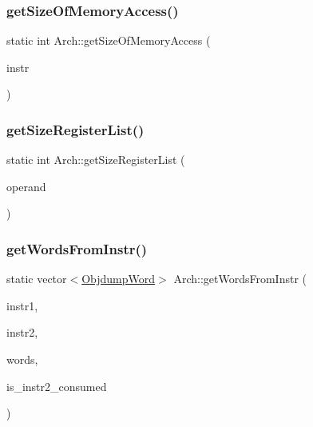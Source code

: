 \mbox{\label{classArch_ad07f05d2dfa30d60ae8a32642b029d10}} 
\subsubsection{\texorpdfstring{get\+Size\+Of\+Memory\+Access()}{getSizeOfMemoryAccess()}}
{\footnotesize\ttfamily static int Arch\+::get\+Size\+Of\+Memory\+Access (\begin{DoxyParamCaption}\item[{const string \&}]{instr }\end{DoxyParamCaption})\hspace{0.3cm}{\ttfamily [static]}}

\mbox{\label{classArch_a386c91cdb12d2a36af51dde5e0deb1e0}} 
\subsubsection{\texorpdfstring{get\+Size\+Register\+List()}{getSizeRegisterList()}}
{\footnotesize\ttfamily static int Arch\+::get\+Size\+Register\+List (\begin{DoxyParamCaption}\item[{const string \&}]{operand }\end{DoxyParamCaption})\hspace{0.3cm}{\ttfamily [static]}}

\mbox{\label{classArch_aab44c957bca6c160dbd3638fc03220cd}} 
\subsubsection{\texorpdfstring{get\+Words\+From\+Instr()}{getWordsFromInstr()}}
{\footnotesize\ttfamily static vector$<$\hyperlink{classObjdumpWord}{Objdump\+Word}$>$ Arch\+::get\+Words\+From\+Instr (\begin{DoxyParamCaption}\item[{const \hyperlink{classObjdumpInstruction}{Objdump\+Instruction} \&}]{instr1,  }\item[{const \hyperlink{classObjdumpInstruction}{Objdump\+Instruction} \&}]{instr2,  }\item[{vector$<$ \hyperlink{classObjdumpWord}{Objdump\+Word} $>$}]{words,  }\item[{bool \&}]{is\+\_\+instr2\+\_\+consumed }\end{DoxyParamCaption})\hspace{0.3cm}{\ttfamily [static]}}

